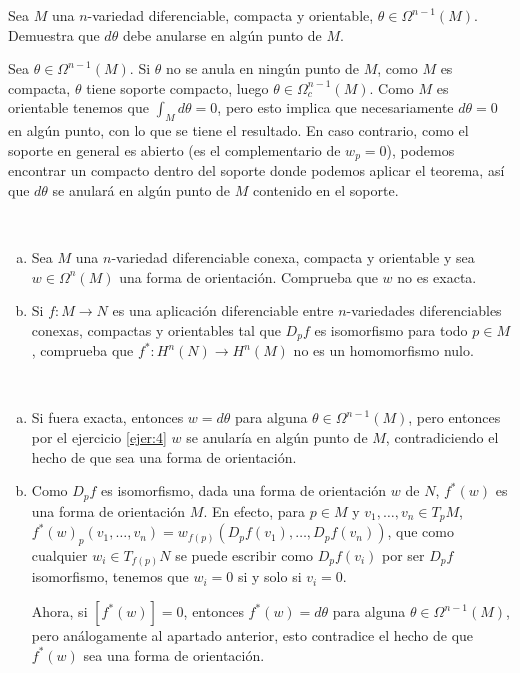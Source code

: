 \documentclass[twoside]{article}
\begin{document}
\begin{ejercicio}{4}
Sea $M$ una $n$-variedad diferenciable, compacta y orientable, $\theta\in \Omega^{n-1}(M)$. Demuestra que $d\theta$ debe anularse en algún punto de $M$.
\end{ejercicio}
\begin{solucion}
Sea $\theta\in\Omega^{n-1}(M)$. Si $\theta$ no se anula en ningún punto de $M$, como $M$ es compacta, $\theta$ tiene soporte compacto, luego $\theta\in\Omega_c^{n-1}(M)$. Como $M$ es orientable tenemos que $\int_M d\theta=0$, pero esto implica que necesariamente $d\theta=0$ en algún punto, con lo que se tiene el resultado. En caso contrario, como el soporte en general es abierto (es el complementario de $w_p=0$), podemos encontrar un compacto dentro del soporte donde podemos aplicar el teorema, así que $d\theta$ se anulará en algún punto de $M$ contenido en el soporte. 
\end{solucion}

\newpage

\begin{ejercicio}{5}\
\begin{enumerate}[a)]
\item Sea $M$ una $n$-variedad diferenciable conexa, compacta y orientable y sea $w\in\Omega^n(M)$ una forma de orientación. Comprueba que $w$ no es exacta.
\item Si $f:M\to N$ es una aplicación diferenciable entre $n$-variedades diferenciables conexas, compactas y orientables tal que $D_pf$ es isomorfismo para todo $p\in M$, comprueba que $f^*:H^n(N)\to H^n(M)$ no es un homomorfismo nulo.
\end{enumerate}

\end{ejercicio}
\begin{solucion}\
\begin{enumerate}[a)]
\item Si fuera exacta, entonces $w=d\theta$ para alguna $\theta\in \Omega^{n-1}(M)$, pero entonces por el ejercicio \ref{ejer:4} $w$ se anularía en algún punto de $M$, contradiciendo el hecho de que sea una forma de orientación.
\item Como $D_pf$ es isomorfismo, dada una forma de orientación $w$ de $N$, $f^*(w)$ es una forma de orientación $M$. En efecto, para $p\in M$ y $v_1,\dots, v_n\in T_pM$, $f^*(w)_p(v_1,\dots, v_n)=w_{f(p)}(D_pf(v_1), \dots, D_pf(v_n))$, que como cualquier $w_i\in T_{f(p)}N$ se puede escribir como $D_pf(v_i)$ por ser $D_pf$ isomorfismo, tenemos que $w_i=0$ si y solo si $v_i=0$.

Ahora, si $[f^*(w)]=0$, entonces $f^*(w)=d\theta$ para alguna $\theta\in \Omega^{n-1}(M)$, pero análogamente al apartado anterior, esto contradice el hecho de que $f^*(w)$ sea una forma de orientación.
\end{enumerate}
\end{solucion}
\end{document}
